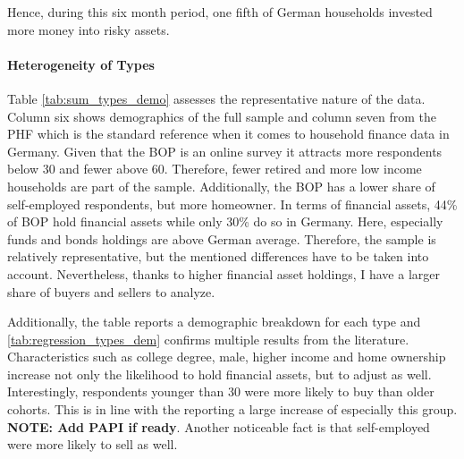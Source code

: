 \documentclass[ProjectABM]{subfiles}
\begin{document}
Hence, during this six month period, one fifth of German households invested more money into risky assets.

%



\paragraph{Heterogeneity of Types}
Table \ref{tab:sum_types_demo} assesses the representative nature of the data. Column six shows demographics of the full sample and column seven from the PHF which is the standard reference when it comes to household finance data in Germany. Given that the BOP is an online survey it attracts more respondents below 30 and fewer above 60. Therefore, fewer retired and more low income households are part of the sample. Additionally, the BOP has a lower share of self-employed respondents, but more homeowner. In terms of financial assets, 44\% of BOP hold financial assets while only 30\% do so in Germany. Here, especially funds and bonds holdings are above German average. Therefore, the sample is relatively representative, but the mentioned differences have to be taken into account. Nevertheless, thanks to higher financial asset holdings, I have a larger share of buyers and sellers to analyze.

Additionally, the table reports a demographic breakdown for each type and \ref{tab:regression_types_dem} confirms multiple results from the literature. Characteristics such as college degree, male, higher income and home ownership increase not only the likelihood to hold financial assets, but to adjust as well. Interestingly, respondents younger than 30 were more likely to buy than older cohorts. This is in line with the \cite{DAI_2021} reporting a large increase of especially this group. \textbf{NOTE: Add PAPI if ready}. Another noticeable fact is that self-employed were more likely to sell as well.

\end{document}
